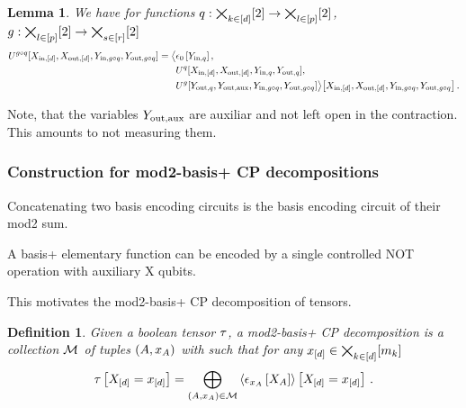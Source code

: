 \documentclass[aps,onecolumn,nofootinbib,pra]{article}
\newtheorem{lemma}{Lemma}
\newtheorem{definition}{Definition}
\begin{document}
    \begin{lemma}
        We have for functions $q:\bigtimes_{k\in[d]}[2]\rightarrow\bigtimes_{l\in[p]}[2]$, $g:\bigtimes_{l\in[p]}[2]\rightarrow\bigtimes_{s\in[r]}[2]$
        \begin{align*}
            U^{g\circ q}[X_{\mathrm{in},[d]},X_{\mathrm{out},[d]},Y_{\mathrm{in},g\circ q},Y_{\mathrm{out},g\circ q}]
            = \big\langle 
            &\epsilon_{0}\left[Y_{\mathrm{in},q}\right],\\
            &U^{q}[X_{\mathrm{in},[d]},X_{\mathrm{out},[d]},Y_{\mathrm{in},q},Y_{\mathrm{out},q}],\\
            &U^{g}[Y_{\mathrm{out},q},Y_{\mathrm{out},\mathrm{aux}},Y_{\mathrm{in},g\circ q},Y_{\mathrm{out},g\circ q}]
             \big\rangle \big[ 
            X_{\mathrm{in},[d]},X_{\mathrm{out},[d]},Y_{\mathrm{in},g\circ q},Y_{\mathrm{out},g\circ q}
             \big] \, .
        \end{align*}
    \end{lemma}

    Note, that the variables $Y_{\mathrm{out},\mathrm{aux}}$ are auxiliar and not left open in the contraction.
    This amounts to not measuring them.

    \subsubsection{Construction for mod2-basis+ CP decompositions}

    Concatenating two basis encoding circuits is the basis encoding circuit of their mod2 sum.

    A basis+ elementary function can be encoded by a single controlled NOT operation with auxiliary X qubits.

    This motivates the mod2-basis+ CP decomposition of tensors.

    \begin{definition}
        Given a boolean tensor $\tau$, a mod2-basis+ CP decomposition is a collection $\mathcal{M}$ of tuples $(A,x_{A})$ with such that for any $x_{[d]}\in\bigtimes_{k\in[d]}[m_{k}]$
        \begin{align*}
            \tau\left[X_{[d]}=x_{[d]}\right]
            = \bigoplus_{(A,x_{A})\in\mathcal{M}} \left\langle \epsilon_{x_{A}}\left[X_{A}\right]\right\rangle \left[ X_{[d]}=x_{[d]} \right] \, .
        \end{align*}
    \end{definition}
\end{document}
